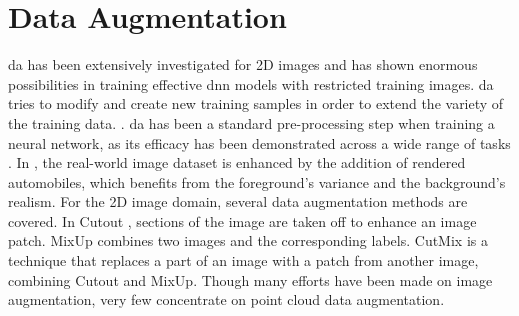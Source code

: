 \section{Data Augmentation}
\acrfull{da} has been extensively investigated for 2D images \parencite{transfsim2000, NIPS2000_ba9a56ce} and has shown enormous possibilities in training effective \acrshort{dnn} models with restricted training images. \acrshort{da} tries to modify and create new training samples in order to extend the variety of the training data. \parencite{xiao2022polarmix} . \acrshort{da} has been a standard pre-processing step when training a neural network, as its efficacy has been demonstrated across a wide range of tasks \parencite{lidar_aug, second2018, pointmixup2020}. In \parencite{abs-1708-01566}, the real-world image dataset is enhanced by the addition of rendered automobiles, which benefits from the foreground's variance and the background's realism. For the 2D image domain, several data augmentation methods are covered. In Cutout \parencite{cutout}, sections of the image are taken off to enhance an image patch. MixUp \parencite{mixup} combines two images and the corresponding labels. CutMix \parencite{cutmix} is a technique that replaces a part of an image with a patch from another image, combining Cutout and MixUp. Though many efforts have been made on image augmentation, very few concentrate on point cloud data augmentation.


